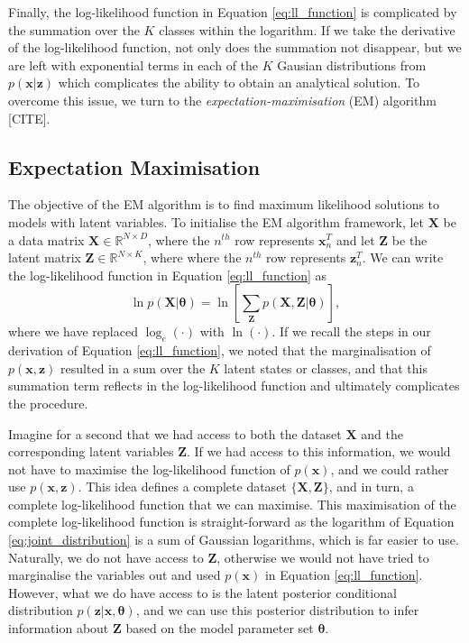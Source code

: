 \documentclass{article}
\begin{document}
Finally, the log-likelihood function in Equation \eqref{eq:ll_function} is complicated by the summation over the $K$ classes within the logarithm. If we take the derivative of the log-likelihood function, not only does the summation not disappear, but we are left with exponential terms in each of the $K$ Gausian distributions from $p(\mathbf{x}\vert\mathbf{z})$ which complicates the ability to obtain an analytical solution. To overcome this issue, we turn to the \emph{expectation-maximisation} (EM) algorithm [CITE].

\subsection{Expectation Maximisation}

The objective of the EM algorithm is to find maximum likelihood solutions to models with latent variables. To initialise the EM algorithm framework, let $\mathbf{X}$ be a data matrix $\mathbf{X}\in \mathbb{R}^{N \times D}$, where the $n^{th}$ row represents $\mathbf{x}_n^T$ and let $\mathbf{Z}$ be the latent matrix $\mathbf{Z}\in \mathbb{R}^{N \times K}$, where where the $n^{th}$ row represents $\mathbf{z}_n^T$. We can write the log-likelihood function in Equation \eqref{eq:ll_function} as
\begin{equation}
\ln p(\mathbf{X}\vert \boldsymbol\theta) = \ln \left[ \sum_{\mathbf{Z}} p(\mathbf{X}, \mathbf{Z}\vert \boldsymbol\theta) \right],
\end{equation}
where we have replaced $\log_e(\cdot)$ with $\ln(\cdot)$. If we recall the steps in our derivation of Equation \eqref{eq:ll_function}, we noted that the marginalisation of $p(\mathbf{x}, \mathbf{z})$ resulted in a sum over the $K$ latent states or classes, and that this summation term reflects in the log-likelihood function and ultimately complicates the procedure. 

Imagine for a second that we had access to both the dataset $\mathbf{X}$ and the corresponding latent variables $\mathbf{Z}$. If we had access to this information, we would not have to maximise the log-likelihood function of $p(\mathbf{x})$, and we could rather use $p(\mathbf{x}, \mathbf{z})$. This idea defines a complete dataset $\{\mathbf{X}, \mathbf{Z}\}$, and in turn, a complete log-likelihood function that we can maximise. This maximisation of the complete log-likelihood function is straight-forward as the logarithm of Equation \eqref{eq:joint_distribution} is a sum of Gaussian logarithms, which is far easier to use. Naturally, we do not have access to $\mathbf{Z}$, otherwise we would not have tried to marginalise the variables out and used $p(\mathbf{x})$ in Equation \eqref{eq:ll_function}. However, what we do have access to is the latent posterior conditional distribution $p(\mathbf{z}\vert\mathbf{x}, \boldsymbol\theta)$, and we can use this posterior distribution to infer information about $\mathbf{Z}$ based on the model parameter set $\boldsymbol\theta$. 
\end{document}
